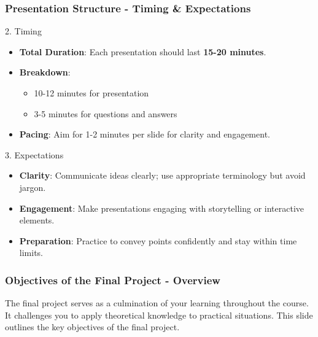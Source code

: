 \documentclass[aspectratio=169]{beamer}
\begin{document}
\begin{frame}[fragile]
    \frametitle{Presentation Structure - Timing \& Expectations}
    \begin{block}{2. Timing}
        \begin{itemize}
            \item \textbf{Total Duration}: Each presentation should last \textbf{15-20 minutes}.
            \item \textbf{Breakdown}:
                \begin{itemize}
                    \item 10-12 minutes for presentation
                    \item 3-5 minutes for questions and answers
                \end{itemize}
            \item \textbf{Pacing}: Aim for 1-2 minutes per slide for clarity and engagement.
        \end{itemize}
    \end{block}

    \begin{block}{3. Expectations}
        \begin{itemize}
            \item \textbf{Clarity}: Communicate ideas clearly; use appropriate terminology but avoid jargon.
            \item \textbf{Engagement}: Make presentations engaging with storytelling or interactive elements.
            \item \textbf{Preparation}: Practice to convey points confidently and stay within time limits.
        \end{itemize}
    \end{block}
\end{frame}

\begin{frame}[fragile]
    \frametitle{Objectives of the Final Project - Overview}
    
    The final project serves as a culmination of your learning throughout the course. 
    It challenges you to apply theoretical knowledge to practical situations. 
    This slide outlines the key objectives of the final project.
\end{frame}
\end{document}
